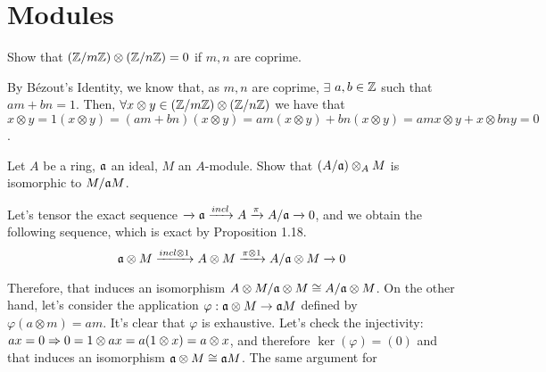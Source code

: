 \section{Modules}

\begin{ex}
	Show that $(\mathbb{Z}/m\mathbb{Z}) \otimes (\mathbb{Z}/n\mathbb{Z}) = 0$ if $m, n$ are coprime.
\end{ex}

\begin{sol}
	By Bézout's Identity, we know that, as $m,n$ are coprime, $\exists$ $a,b \in \mathbb{Z}$ such that $am+bn = 1$. Then, $\forall x \otimes y \in (\mathbb{Z}/m\mathbb{Z}) \otimes (\mathbb{Z}/n\mathbb{Z})$ we have that 
	$
	x \otimes y = 1(x \otimes y) = (am+bn)(x \otimes y) = am(x \otimes y) + bn(x \otimes y) = amx \otimes y + x \otimes bny = 0
	$.
\end{sol}

\begin{ex}
	Let $A$ be a ring, $\mathfrak{a}$ an ideal, $M$ an $A$-module. Show that $(A/\mathfrak{a}) \otimes_A M$ is isomorphic to $M/\mathfrak{a} M$.
\end{ex}

\begin{sol}
	Let's tensor the exact sequence $\xrightarrow[]{} \mathfrak{a} \xrightarrow[]{incl} A \xrightarrow[]{\pi}  A/\mathfrak{a} \xrightarrow[]{}  0$, and we obtain the following sequence, which is exact by Proposition 1.18.
	\[
		\mathfrak{a} \otimes M \xrightarrow[]{incl \otimes 1} A \otimes M \xrightarrow[]{\pi \otimes 1}  A/\mathfrak{a}  \otimes M \xrightarrow[]{} 0
	\]

	Therefore, that induces an isomorphism $A \otimes M / \mathfrak{a} \otimes M \cong A/\mathfrak{a} \otimes M$. On the other hand, let's consider the application $\varphi: \mathfrak{a} \otimes M \to \mathfrak{a} M$ defined by $\varphi(a \otimes m) = am$. It's clear that $\varphi$ is exhaustive. Let's check the injectivity: $ax = 0 \Rightarrow 0 = 1 \otimes ax = a(1 \otimes x) = a \otimes x$, and therefore $\ker(\varphi) = (0)$ and that induces an isomorphism $\mathfrak{a} \otimes M \cong \mathfrak{a} M$. The same argument for 
\end{sol}
